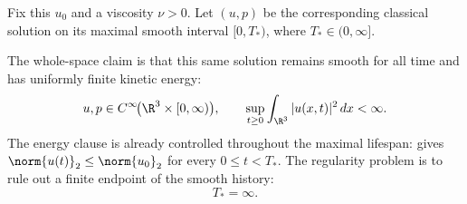 Fix this \(u_0\) and a viscosity \(\nu>0\).
Let \((u,p)\) be the corresponding classical solution on its maximal smooth interval \([0,T_*)\), where \(T_*\in(0,\infty]\).

The whole-space claim is that this same solution remains smooth for all time and has uniformly finite kinetic energy:
\begin{equation}\label{eq:WholeSpaceRegularityTarget}
  u,p\in C^\infty\!\bigl(\R^3\times[0,\infty)\bigr),
  \qquad
  \sup_{t\geq0}\int_{\R^3}|u(x,t)|^2\,dx<\infty.
\end{equation}
The energy clause is already controlled throughout the maximal lifespan:  gives \(\norm{u(t)}_2\leq\norm{u_0}_2\) for every \(0\leq t<T_*\).
The regularity problem is to rule out a finite endpoint of the smooth history:
\[
  T_*=\infty.
\]

